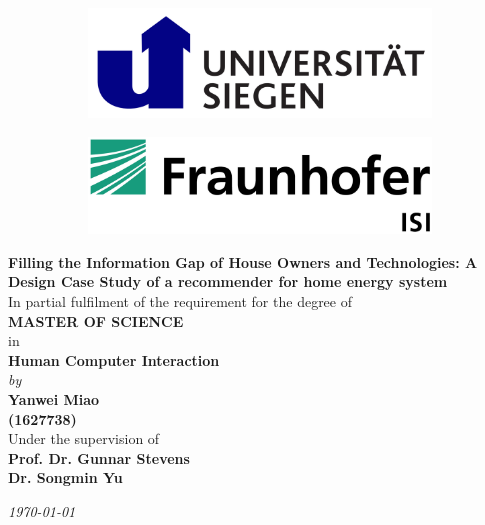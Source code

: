 \begin{titlepage}

\begin{center}

\vspace*{-1cm}

\begin{figure}[h]
  \begin{subfigure}{0.50\textwidth}
    \includegraphics[width=0.8\linewidth, left]{Images/siegen.png}
  \end{subfigure}
  \begin{subfigure}{0.49\textwidth}
    \includegraphics[width=0.8\linewidth, right]{Images/isi.jpeg}
  \end{subfigure}
\end{figure}

\vfill

{\Large \bf Filling the Information Gap of House Owners and Technologies: A Design Case Study of a recommender for home energy system} \\

\vfill
In partial fulfilment of the requirement for the degree of\\
{\large \bf MASTER OF SCIENCE}\\
in\\ 
{\large \bf Human Computer Interaction } \\
{\em by} \\
{\large \bf Yanwei Miao} \\
{\large \bf (1627738)}\\

Under the supervision of \\
{\bf \large Prof. Dr. Gunnar Stevens} \\
{\bf \large Dr. Songmin Yu} \\

\vfill

{\it \large \today}

\end{center}

\end{titlepage}

\clearpage